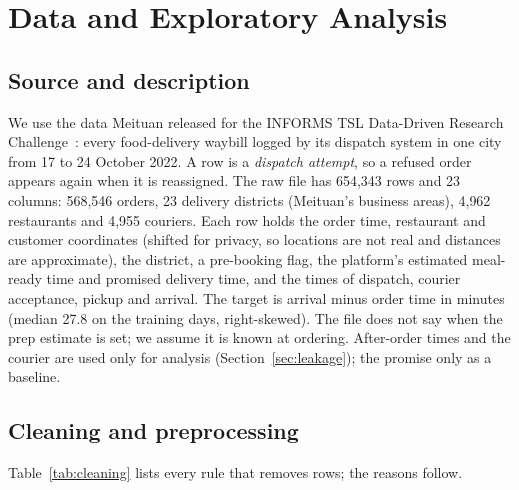 \section{Data and Exploratory Analysis}
\label{sec:data}

\subsection{Source and description}
We use the data Meituan released for the INFORMS TSL Data-Driven Research
Challenge~\cite{zhao2024meituan}: every food-delivery waybill logged by its dispatch system in one city
from 17 to 24 October 2022. A row is a \emph{dispatch attempt}, so a refused order appears again when it
is reassigned. The raw file has 654{,}343 rows and 23 columns: 568{,}546 orders, 23 delivery districts
(Meituan's business areas), 4{,}962 restaurants and 4{,}955 couriers. Each row holds the order time,
restaurant and customer coordinates (shifted for privacy, so locations are not real and distances are
approximate), the district, a pre-booking flag, the platform's estimated meal-ready time and promised
delivery time, and the times of dispatch, courier acceptance, pickup and arrival. The target is arrival
minus order time in minutes (median 27.8 on the training days, right-skewed). The file does not say when
the prep estimate is set; we assume it is known at ordering. After-order times and the courier are used
only for analysis (Section~\ref{sec:leakage}); the promise only as a baseline.

\subsection{Cleaning and preprocessing}
Table~\ref{tab:cleaning} lists every rule that removes rows; the reasons follow.

